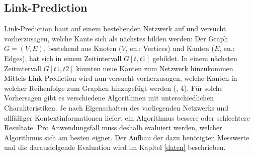 \subsection{Link-Prediction}
Link-Prediction baut auf einem bestehenden Netzwerk auf und versucht vorherzusagen, welche Kante sich als nächstes bilden werden:
Der Graph $G = (V, E)$, bestehend aus Knoten ($V$, en.: Vertices) und Kanten ($E$, en.: Edges), hat sich in einem Zeitintervall $G[t, t1]$ gebildet.
In einem nächsten Zeitintervall $G[t1, t2]$ könnten neue Kanten zum Netzwerk hinzukommen.
Mittels Link-Prediction wird nun versucht vorherzusagen, welche Kanten in welcher Reihenfolge zum Graphen hinzugefügt werden (\cite{gao_link_2015}, 4).
Für solche Vorhersagen gibt es verschiedene Algorithmen mit unterschiedlichen Charakteristiken.
Je nach Eigenschaften des vorliegenden Netzwerks und allfälliger Kontextinformationen liefert ein Algorithmus bessere oder schlechtere Resultate.
Pro Anwendungsfall muss deshalb evaluiert werden, welcher Algorithmus sich am besten eignet.
Der Aufbau der dazu benötigten Messwerte und die darausfolgende Evaluation wird im Kapitel \ref{daten} beschrieben.
